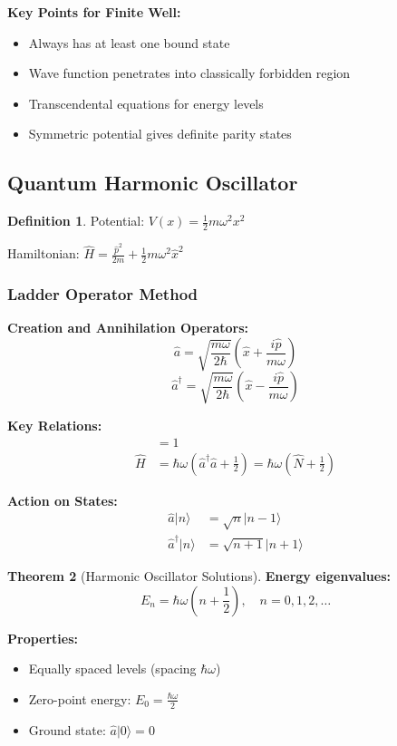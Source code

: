 \documentclass[12pt,a4paper]{article}
\theoremstyle{definition}
\newtheorem{theorem}{Theorem}[section]
\newtheorem{definition}[theorem]{Definition}
\begin{document}
\begin{tipbox}
\textbf{Key Points for Finite Well:}
\begin{itemize}
    \item Always has at least one bound state
    \item Wave function penetrates into classically forbidden region
    \item Transcendental equations for energy levels
    \item Symmetric potential gives definite parity states
\end{itemize}
\end{tipbox}

\subsection{Quantum Harmonic Oscillator}

\begin{definition}
Potential: $V(x) = \frac{1}{2}m\omega^2x^2$

Hamiltonian: $\hat{H} = \frac{\hat{p}^2}{2m} + \frac{1}{2}m\omega^2\hat{x}^2$
\end{definition}

\subsubsection{Ladder Operator Method}

\begin{importantbox}
\textbf{Creation and Annihilation Operators:}
\[
\hat{a} = \sqrt{\frac{m\omega}{2\hbar}}\left(\hat{x} + \frac{i\hat{p}}{m\omega}\right)
\]
\[
\hat{a}^\dagger = \sqrt{\frac{m\omega}{2\hbar}}\left(\hat{x} - \frac{i\hat{p}}{m\omega}\right)
\]

\textbf{Key Relations:}
\begin{align}
[\hat{a}, \hat{a}^\dagger] &= 1 \\
\hat{H} &= \hbar\omega\left(\hat{a}^\dagger\hat{a} + \frac{1}{2}\right) = \hbar\omega\left(\hat{N} + \frac{1}{2}\right)
\end{align}

\textbf{Action on States:}
\begin{align}
\hat{a}|n\rangle &= \sqrt{n}|n-1\rangle \\
\hat{a}^\dagger|n\rangle &= \sqrt{n+1}|n+1\rangle
\end{align}
\end{importantbox}

\begin{theorem}[Harmonic Oscillator Solutions]
\textbf{Energy eigenvalues:}
\[
E_n = \hbar\omega\left(n + \frac{1}{2}\right), \quad n = 0, 1, 2, \ldots
\]

\textbf{Properties:}
\begin{itemize}
    \item Equally spaced levels (spacing $\hbar\omega$)
    \item Zero-point energy: $E_0 = \frac{\hbar\omega}{2}$
    \item Ground state: $\hat{a}|0\rangle = 0$
\end{itemize}
\end{theorem}
\end{document}
